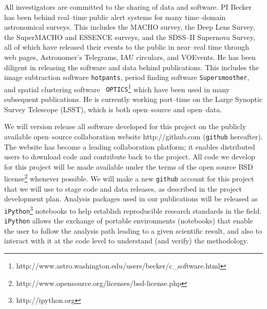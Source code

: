 All investigators are committed to the sharing of data and software.
PI Becker has been behind real--time public alert systems for many
time--domain astronomical surveys.  This includes the MACHO survey,
the Deep Lens Survey, the SuperMACHO and ESSENCE surveys, and the
SDSS--II Supernova Survey, all of which have released their events to
the public in near--real time through web pages, Astronomer's
Telegrams, IAU circulars, and VOEvents.  He has been diligent in
releasing the software and data behind publications.  This includes
the image subtraction software {\tt hotpants}, period finding software
{\tt Supersmoother}, and spatial clustering software {\tt
  OPTICS}\footnote{http://www.astro.washington.edu/users/becker/c\_software.html}
which have been used in many subsequent publications.  He is currently
working part--time on the Large Synoptic Survey Telescope (LSST),
which is both open--source and open--data.

We will version release all software developed for this project on the
publicly available open--source collaboration website
http://github.com ({\tt github} hereafter).  The website has become a
leading collaboration platform; it enables distributed users to
download code and contribute back to the project.  All code we develop
for this project will be made available under the terms of the open
source BSD
license\footnote{http://www.opensource.org/licenses/bsd-license.php}
whenever possible.  We will make a new {\tt github} account for this
project that we will use to stage code and data releases, as described
in the project development plan.  Analysis packages used in our
publications will be released as {\tt
iPython}\footnote{http://ipython.org} notebooks to help establish
reproducible research standards in the field.  {\tt iPython} allows
the exchange of portable environments (notebooks) that enable the user
to follow the analysis path leading to a given scientific result, and
also to interact with it at the code level to understand (and verify)
the methodology.



